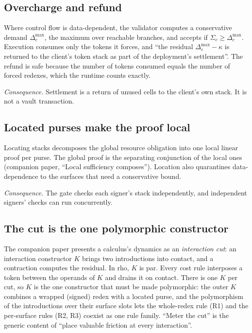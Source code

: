 \documentclass[11pt]{article}
\begin{document}
\subsection{Overcharge and refund}

Where control flow is data-dependent, the validator computes a conservative demand $\Delta^{\max}_c$, the maximum over reachable branches, and accepts if $\Sigma_c \ge \Delta^{\max}_c$. Execution consumes only the tokens it forces, and ``the residual $\Delta^{\max}_c - \kappa$ is returned to the client's token stack as part of the deployment's settlement''. The refund is safe because the number of tokens consumed equals the number of forced redexes, which the runtime counts exactly.

\emph{Consequence.} Settlement is a return of unused cells to the client's own stack. It is not a vault transaction.

\subsection{Located purses make the proof local}

Locating stacks decomposes the global resource obligation into one local linear proof per purse. The global proof is the separating conjunction of the local ones (companion paper, ``Local sufficiency composes''). Location also quarantines data-dependence to the surfaces that need a conservative bound.

\emph{Consequence.} The gate checks each signer's stack independently, and independent signers' checks can run concurrently.

\subsection{The cut is the one polymorphic constructor}\label{sec:polycut}

The companion paper presents a calculus's dynamics as an \emph{interaction cut}: an interaction constructor $K$ brings two introductions into contact, and a contraction computes the residual. In rho, $K$ is par. Every cost rule interposes a token between the operands of $K$ and drains it on contact. There is one $K$ per cut, so $K$ is the one constructor that must be made polymorphic: the outer $K$ combines a wrapped (signed) redex with a located purse, and the polymorphism of the introductions over their surface slots lets the whole-redex rule (R1) and the per-surface rules (R2, R3) coexist as one rule family. ``Meter the cut'' is the generic content of ``place valuable friction at every interaction''.
\end{document}
